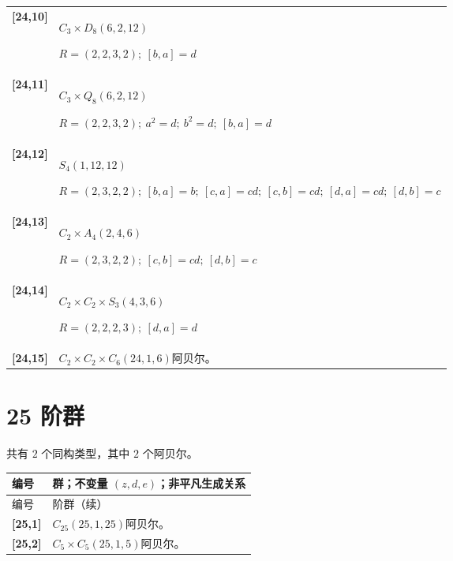 \documentclass[UTF8,fontset=fandol,11pt,a4paper]{ctexart}
\begin{document}
\begin{longtable}{@{}p{17mm}>{\raggedright\arraybackslash}p{141mm}@{}}
\textbf{[24,10]} & $C_{3}\times D_{8}$\quad $(6,2,12)$\par\(R=(2,2,3,2);\allowbreak\ [b,a]=d\)\\[3pt]

\textbf{[24,11]} & $C_{3}\times Q_{8}$\quad $(6,2,12)$\par\(R=(2,2,3,2);\allowbreak\ a^{2}=d;\allowbreak\ b^{2}=d;\allowbreak\ [b,a]=d\)\\[3pt]

\textbf{[24,12]} & $S_{4}$\quad $(1,12,12)$\par\(R=(2,3,2,2);\allowbreak\ [b,a]=b;\allowbreak\ [c,a]=cd;\allowbreak\ [c,b]=cd;\allowbreak\ [d,a]=cd;\allowbreak\ [d,b]=c\)\\[3pt]

\textbf{[24,13]} & $C_{2}\times A_{4}$\quad $(2,4,6)$\par\(R=(2,3,2,2);\allowbreak\ [c,b]=cd;\allowbreak\ [d,b]=c\)\\[3pt]

\textbf{[24,14]} & $C_{2}\times C_{2}\times S_{3}$\quad $(4,3,6)$\par\(R=(2,2,2,3);\allowbreak\ [d,a]=d\)\\[3pt]

\textbf{[24,15]} & $C_{2}\times C_{2}\times C_{6}$\quad $(24,1,6)$\quad 阿贝尔。\\[3pt]

\end{longtable}\endgroup

\section*{25 阶群}\label{order:25}

共有 $2$ 个同构类型，其中 $2$ 个阿贝尔。

\begingroup\small\setlength{\tabcolsep}{3pt}\renewcommand{\arraystretch}{1.12}

\begin{longtable}{@{}p{17mm}>{\raggedright\arraybackslash}p{141mm}@{}}

\toprule 编号 & 群；不变量 $(z,d,e)$；非平凡生成关系\\\midrule\endfirsthead

\toprule 编号 & 25 阶群（续）\\\midrule\endhead\bottomrule\endfoot

\textbf{[25,1]} & $C_{25}$\quad $(25,1,25)$\quad 阿贝尔。\\[3pt]

\textbf{[25,2]} & $C_{5}\times C_{5}$\quad $(25,1,5)$\quad 阿贝尔。\\[3pt]

\end{longtable}\endgroup
\end{document}
